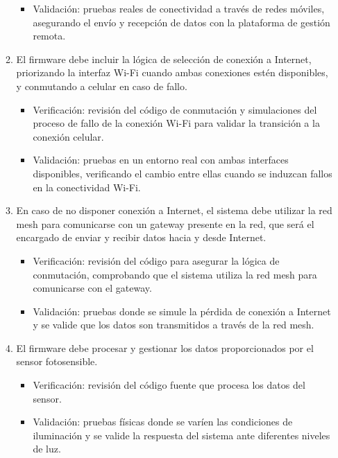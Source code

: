 \documentclass[
11pt, %
]{charter}
\begin{document}
\begin{enumerate}
\begin{enumerate}
\begin{itemize}
				\item Validación: pruebas reales de conectividad a través de redes móviles, asegurando el envío y recepción de datos con la plataforma de gestión remota.
				\end{itemize}
			\item El firmware debe incluir la lógica de selección de conexión a Internet, priorizando la interfaz Wi-Fi cuando ambas conexiones estén disponibles, y conmutando a celular en caso de fallo.
				\begin{itemize}
				\item Verificación: revisión del código de conmutación y simulaciones del proceso de fallo de la conexión Wi-Fi para validar la transición a la conexión celular.
				\item Validación: pruebas en un entorno real con ambas interfaces disponibles, verificando el cambio entre ellas cuando se induzcan fallos en la conectividad Wi-Fi.
				\end{itemize}
			\item En caso de no disponer conexión a Internet, el sistema debe utilizar la red mesh para comunicarse con un gateway presente en la red, que será el encargado de enviar y recibir datos hacia y desde Internet. 
				\begin{itemize}
				\item Verificación: revisión del código para asegurar la lógica de conmutación, comprobando que el sistema utiliza la red mesh para comunicarse con el gateway.
				\item Validación: pruebas donde se simule la pérdida de conexión a Internet y se valide que los datos son transmitidos a través de la red mesh.
				\end{itemize}
			\item El firmware debe procesar y gestionar los datos proporcionados por el sensor fotosensible.
				\begin{itemize}
				\item Verificación: revisión del código fuente que procesa los datos del sensor.
				\item Validación: pruebas físicas donde se varíen las condiciones de iluminación y se valide la respuesta del sistema ante diferentes niveles de luz.
				\end{itemize}


\end{enumerate}
\end{enumerate}
\end{document}
